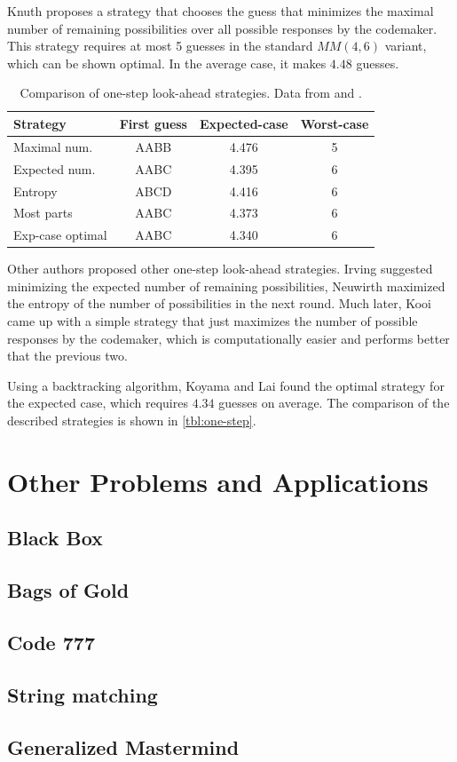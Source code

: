 Knuth\cite{mm-knuth} proposes a strategy that chooses the guess
  that minimizes the maximal number of remaining possibilities over all
  possible responses by the codemaker.
This strategy requires at most 5 guesses in the standard $MM(4,6)$ variant,
  which can be shown optimal.
In the average case, it makes $4.48$ guesses.

\begin{table} \label{tbl:one-step}
\begin{center}
\begin{tabular}{|l|c|c|c|}
\hline Strategy & First guess & Expected-case & Worst-case \\ \hline
Maximal num. & AABB & 4.476 & 5 \\ \hline
Expected num. & AABC & 4.395 & 6 \\ \hline
Entropy & ABCD & 4.416 & 6 \\ \hline
Most parts & AABC & 4.373 & 6 \\ \hline
Exp-case optimal & AABC & 4.340 & 6 \\ \hline
\end{tabular}
\caption{Comparison of one-step look-ahead strategies. Data from \cite{mm-ville} and \cite{mm-mostparts}.}
\end{center}
\end{table}

Other authors proposed other one-step look-ahead strategies.
Irving\cite{mm-expnum} suggested minimizing the expected number
  of remaining possibilities,
Neuwirth\cite{mm-entropy} maximized the entropy of the number
  of possibilities in the next round.
Much later, Kooi\cite{mm-mostparts} came up with a simple strategy that
  just maximizes the number of possible responses by the codemaker,
  which is computationally easier and performs better that the previous two.

Using a backtracking algorithm, Koyama and Lai \cite{mm-exp-opt} found
  the optimal strategy for the expected case, which requires $4.34$
  guesses on average.
The comparison of the described strategies is shown in \autoref{tbl:one-step}.


\section{Other Problems and Applications}
\subsection{Black Box}
\subsection{Bags of Gold}

\subsection{Code 777}

\subsection{String matching}

\subsection{Generalized Mastermind}


